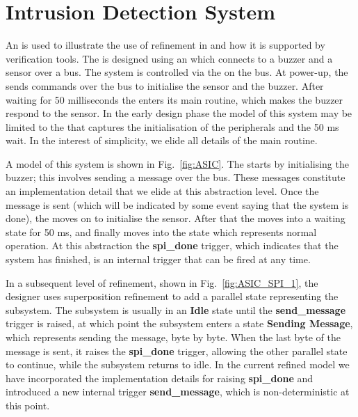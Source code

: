 

\section{Intrusion Detection System}
\label{sec:secbot}

An \IDS is used to illustrate the use of refinement in \statecharts and how it is supported by \EventB verification tools.
The \IDS is designed using an \ASIC which connects to a buzzer and a sensor over a \SPI bus. The system is controlled via the \ASIC on the \SPI bus. At power-up, the \ASIC sends commands over the \SPI bus to initialise the sensor and the buzzer. After waiting for 50 milliseconds the \ASIC enters its main routine, which makes the buzzer respond to the sensor. In the early design phase the \statechart model of this system may be limited to the \ASIC that captures the initialisation of the peripherals and the 50 ms wait. In the interest of simplicity, we elide all details of the main routine.

A \statechart model of this system is shown in Fig.~\ref{fig:ASIC}. The \ASIC starts by initialising the buzzer; this involves sending a message over the \SPI bus. These messages constitute an implementation detail that we elide at this abstraction level. Once the message is sent (which will be indicated by some event saying that the \SPI system is done), the \ASIC moves on to initialise the sensor. After that the \ASIC moves into a waiting state for 50 ms, and finally moves into the state which represents normal operation. At this abstraction the \textbf{spi\_done} trigger, which indicates that the \SPI system has finished, is an internal trigger that can be fired at any time.

In a subsequent level of refinement, shown in Fig.~\ref{fig:ASIC_SPI_1}, the designer uses superposition refinement to add a parallel state representing the \SPI subsystem. The \SPI subsystem is usually in an \textbf{Idle} state until the \textbf{send\_message} trigger is raised, at which point the \SPI subsystem enters a state \textbf{Sending Message}, which represents sending the message, byte by byte. When the last byte of the message is sent, it raises the \textbf{spi\_done} trigger, allowing the other parallel state to continue, while the \SPI subsystem returns to idle. In the current refined model we have incorporated the implementation details for raising \textbf{spi\_done} and introduced a new internal trigger 
\textbf{send\_message}, which is non-deterministic at this point.

